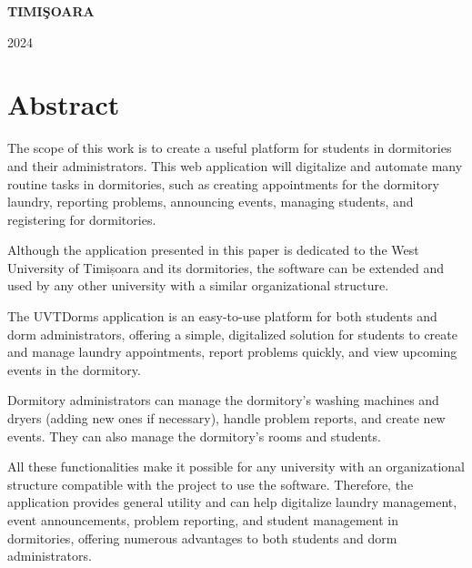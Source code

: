 \documentclass[12pt,a4paper]{report}
\theoremstyle{definition}
\theoremstyle{remark}
\begin{document}
\vfill
\begin{center}
    {\bf TIMI\c SOARA

        2024}
\end{center}
\newpage
\normalsize{}
\section*{Abstract}

\par The scope of this work is to create a useful platform for students in dormitories and their administrators. This web application will digitalize and automate many routine tasks in dormitories, such as creating appointments for the dormitory laundry, reporting problems, announcing events, managing students, and registering for dormitories. 
\vspace{1em}

\par Although the application presented in this paper is dedicated to the West University of Timișoara and its dormitories, the software can be extended and used by any other university with a similar organizational structure.
\vspace{1em}

\par The UVTDorms application is an easy-to-use platform for both students and dorm administrators, offering a simple, digitalized solution for students to create and manage laundry appointments, report problems quickly, and view upcoming events in the dormitory.
\vspace{1em}

\par Dormitory administrators can manage the dormitory's washing machines and \textnormal{dry\-ers} (adding new ones if necessary), handle problem reports, and create new events. They can also manage the dormitory's rooms and students.
\vspace{1em}

\par All these functionalities make it possible for any university with an organizational structure compatible with the project to use the software. Therefore, the application provides general utility and can help digitalize laundry management, event announcements, problem reporting, and student management in dormitories, offering numerous advantages to both students and dorm administrators.
\vspace{1em}

\tableofcontents
\newpage
\end{document}
